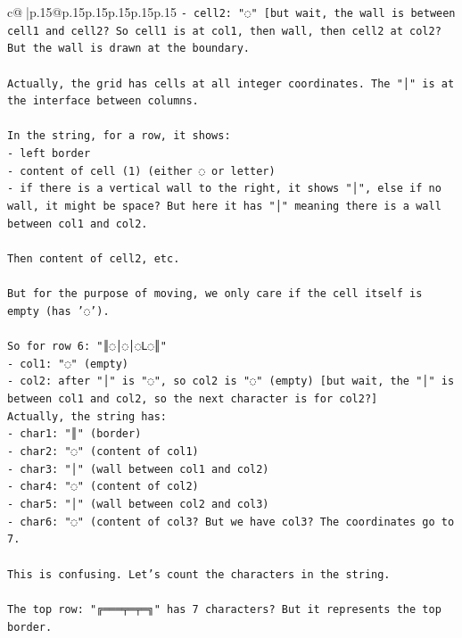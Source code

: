 \documentclass{article}
\begin{document}
{\begin{supertabular}{c@{$\;$}|p{.15\linewidth}@{}p{.15\linewidth}p{.15\linewidth}p{.15\linewidth}p{.15\linewidth}p{.15\linewidth}}
{{{\texttt{{-} cell2: "◌"   {[}but wait, the wall is between cell1 and cell2? So cell1 is at col1, then wall, then cell2 at col2? But the wall is drawn at the boundary.} \\
\\ 
\texttt{Actually, the grid has cells at all integer coordinates. The "│" is at the interface between columns.} \\
\\ 
\texttt{In the string, for a row, it shows:} \\
\texttt{{-} left border} \\
\texttt{{-} content of cell (1) (either ◌ or letter)} \\
\texttt{{-} if there is a vertical wall to the right, it shows "│", else if no wall, it might be space? But here it has "│" meaning there is a wall between col1 and col2.} \\
\\ 
\texttt{Then content of cell2, etc.} \\
\\ 
\texttt{But for the purpose of moving, we only care if the cell itself is empty (has '◌').} \\
\\ 
\texttt{So for row 6: "║◌│◌│◌L◌║"} \\
\texttt{{-} col1: "◌" (empty)} \\
\texttt{{-} col2: after "│" is "◌", so col2 is "◌" (empty) {[}but wait, the "│" is between col1 and col2, so the next character is for col2?{]}} \\
\texttt{Actually, the string has:} \\
\texttt{{-} char1: "║" (border)} \\
\texttt{{-} char2: "◌" (content of col1)} \\
\texttt{{-} char3: "│" (wall between col1 and col2)} \\
\texttt{{-} char4: "◌" (content of col2)} \\
\texttt{{-} char5: "│" (wall between col2 and col3)} \\
\texttt{{-} char6: "◌" (content of col3? But we have col3? The coordinates go to 7.} \\
\\ 
\texttt{This is confusing. Let's count the characters in the string.} \\
\\ 
\texttt{The top row: "╔═══╤═╤═╗" has 7 characters? But it represents the top border.} \\
\\ 
}}}
\end{supertabular}}
\end{document}
